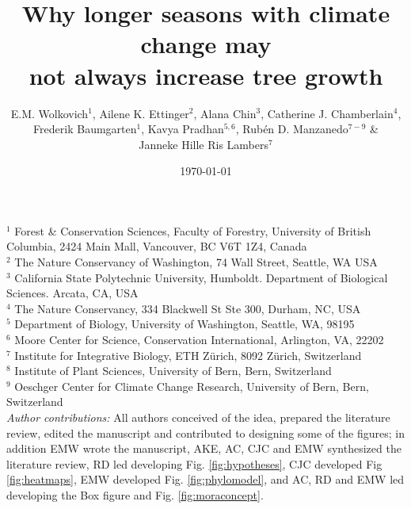 \documentclass[11pt]{article}
\begin{document}
\renewcommand{\refname}{\CHead{}}


\title{Why longer seasons with climate change may \\ not always increase tree growth} 
\author{E.M. Wolkovich$^1$, Ailene K. Ettinger$^2$, Alana Chin$^3$, Catherine J. Chamberlain$^4$,\\ Frederik Baumgarten$^1$, Kavya Pradhan$^{5,6}$, Rub{\'e}n D. Manzanedo$^{7-9}$ \& \\ Janneke Hille Ris Lambers$^7$}
\date{\today}
\maketitle

$^1$ Forest \& Conservation Sciences, Faculty of Forestry, University of British Columbia, 2424 Main Mall, Vancouver, BC V6T 1Z4, Canada\\
$^2$ The Nature Conservancy of Washington, 74 Wall Street, Seattle, WA  USA \\
$^3$ California State Polytechnic University, Humboldt. Department of Biological Sciences. Arcata, CA, USA \\
$^4$ The Nature Conservancy, 334 Blackwell St Ste 300, Durham, NC, USA \\ 
$^5$ Department of Biology, University of Washington, Seattle, WA, 98195 \\
$^6$ Moore Center for Science, Conservation International, Arlington, VA, 22202 \\ %
$^7$ Institute for Integrative Biology, ETH Z{\"u}rich, 8092 Z{\"u}rich, Switzerland \\ %
$^8$ Institute of Plant Sciences, University of Bern, Bern, Switzerland \\
$^9$ Oeschger Center for Climate Change Research, University of Bern, Bern, Switzerland \\

\emph{Author contributions:}  All authors conceived of the idea, prepared the literature review, edited the manuscript and contributed to designing some of the figures; in addition EMW wrote the manuscript, AKE, AC, CJC  and EMW synthesized the literature review, RD led developing Fig. \ref{fig:hypotheses}, CJC developed Fig \ref{fig:heatmaps}, EMW developed Fig. \ref{fig:phylomodel}, and AC, RD and EMW led developing the Box figure and Fig. \ref{fig:moraconcept}. 
\end{document}
